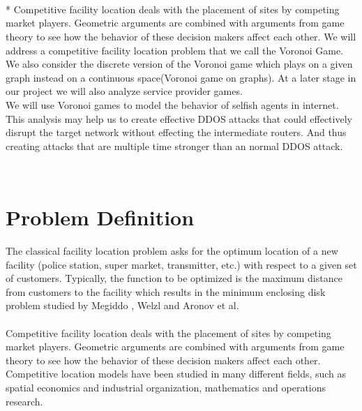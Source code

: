 \documentclass[12pt]{article}
\begin{document}

%
%
\makefrontpage
\setcounter{page}{2}
\setcounter{section}{0}
\pagestyle{plain}
\newpage


\\\\\\*
\large
 \indent Competitive facility location deals with the placement of sites by competing
market players. Geometric arguments are combined with arguments from game theory to see how the behavior of these decision makers affect each other. We will address a competitive facility location problem that we call the Voronoi Game. We also consider the discrete version of the Voronoi game which plays on a given graph instead on a continuous space(Voronoi game on graphs). At a later stage in our project we will also analyze service provider games.\\

We will use Voronoi  games to model the behavior of selfish agents in internet.  
This analysis may help us to create effective DDOS attacks that could effectively disrupt the target network without effecting the intermediate routers. And thus creating attacks that are multiple time stronger than an normal DDOS attack.
\newpage
\setcounter{tocdepth}{3}
\sectionfont{\Large}
\subsectionfont{\large}
\subsubsectionfont{\large}

\tableofcontents

\newpage

\\
\section{Problem Definition}

\indent \indent The classical facility location problem asks for the optimum location of a new facility (police station, super market, transmitter, etc.) with respect to a given set of customers. Typically, the function to be optimized is the maximum distance from customers to the facility which results in the minimum enclosing disk problem studied by Megiddo , Welzl and Aronov et al\cite{Aronov98facilitylocation}.\\\\
\indent Competitive facility location deals with the placement of sites by competing market players. Geometric arguments are combined with arguments from game theory to see how the behavior of these decision makers affect each other. Competitive location models have been studied in many different fields, such as spatial economics and industrial organization, mathematics and operations research\cite{Ahn01competitivefacility}.\\
\end{document}
